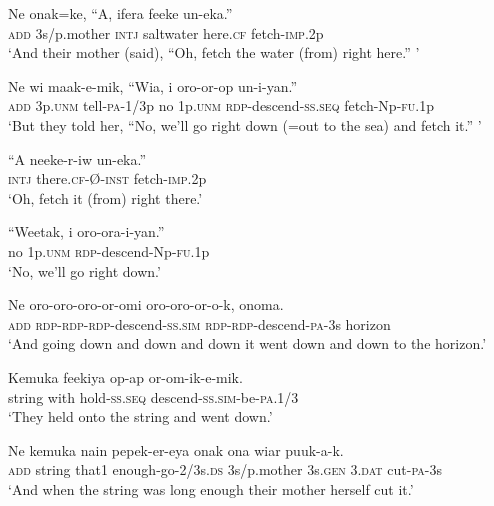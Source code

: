\ea\label{ex:a:x19}
\gll  Ne  onak=ke,  “A,  ifera  feeke  un-eka.” \\
\textsc{add}  3s/p.mother  \textsc{intj}  saltwater  here.\textsc{cf}  fetch-\textsc{imp}.2p \\
\glt ‘And their mother (said), “Oh, fetch the water (from) right here.” ’ \\
\z


\ea\label{ex:a:x20}
\gll  Ne  wi  maak-e-mik,  “Wia,  i  oro-or-op            un-i-yan.” \\
\textsc{add}  3p.\textsc{unm}  tell-\textsc{pa}-1/3p  no  1p.\textsc{unm}  \textsc{rdp}-descend-\textsc{ss.seq} fetch-Np-\textsc{fu}.1p \\


\glt ‘But they told her, “No, we’ll go right down (=out to the sea) and fetch it.” ’ \\
\z


\ea\label{ex:a:x21}
\gll  “A  neeke-r-iw  un-eka.” \\
\textsc{intj}  there.\textsc{cf}-Ø-\textsc{inst}  fetch-\textsc{imp}.2p \\
\glt ‘Oh, fetch it (from) right there.’ \\
\z


\ea\label{ex:a:x22}
\gll  “Weetak,  i  oro-ora-i-yan.” \\
no  1p.\textsc{unm}  \textsc{rdp}-descend-Np-\textsc{fu}.1p \\
\glt ‘No, we’ll go right down.’ \\
\z


\ea\label{ex:a:x23}
\gll  Ne  oro-oro-oro-or-omi  oro-oro-or-o-k,  onoma. \\
\textsc{add}  \textsc{rdp}-\textsc{rdp}-\textsc{rdp}-descend-\textsc{ss}.\textsc{sim}  \textsc{rdp}-\textsc{rdp}-descend-\textsc{pa}-3s  horizon \\
\glt ‘And going down and down and down it went down and down to the horizon.’ \\
\z


\ea\label{ex:a:x24}
\gll  Kemuka  feekiya  op-ap  or-om-ik-e-mik. \\
string  with  hold-\textsc{ss.seq}  descend-\textsc{ss}.\textsc{sim}-be-\textsc{pa}.1/3 \\
\glt ‘They held onto the string and went down.’ \\
\z


\ea\label{ex:a:x25}
\gll  Ne  kemuka  nain  pepek-er-eya  onak  ona  wiar  puuk-a-k. \\
\textsc{add}  string  that1  enough-go-2/3s.\textsc{ds}  3s/p.mother  3s.\textsc{gen}  3.\textsc{dat}  cut-\textsc{pa}-3s \\
\glt ‘And when the string was long enough their mother herself cut it.’ \\
\z


